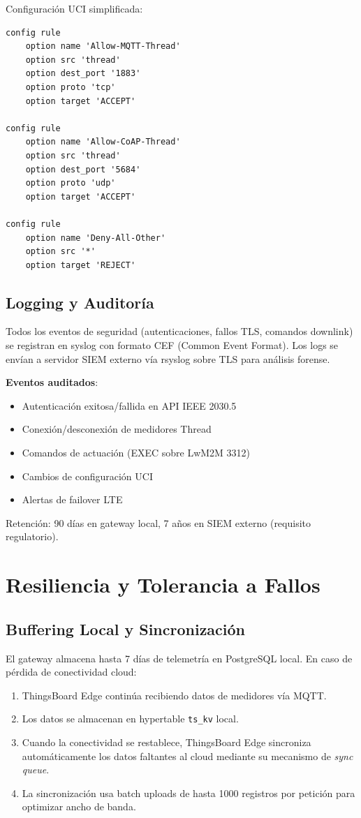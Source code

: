 Configuración UCI simplificada:

\begin{verbatim}
config rule
    option name 'Allow-MQTT-Thread'
    option src 'thread'
    option dest_port '1883'
    option proto 'tcp'
    option target 'ACCEPT'

config rule
    option name 'Allow-CoAP-Thread'
    option src 'thread'
    option dest_port '5684'
    option proto 'udp'
    option target 'ACCEPT'

config rule
    option name 'Deny-All-Other'
    option src '*'
    option target 'REJECT'
\end{verbatim}

\subsection{Logging y Auditoría}

Todos los eventos de seguridad (autenticaciones, fallos TLS, comandos downlink) se registran en syslog con formato CEF (Common Event Format). Los logs se envían a servidor SIEM externo vía rsyslog sobre TLS para análisis forense.

\textbf{Eventos auditados}:
\begin{itemize}
    \item Autenticación exitosa/fallida en API IEEE 2030.5
    \item Conexión/desconexión de medidores Thread
    \item Comandos de actuación (EXEC sobre LwM2M 3312)
    \item Cambios de configuración UCI
    \item Alertas de failover LTE
\end{itemize}

Retención: 90 días en gateway local, 7 años en SIEM externo (requisito regulatorio).

\section{Resiliencia y Tolerancia a Fallos}

\subsection{Buffering Local y Sincronización}

El gateway almacena hasta 7 días de telemetría en PostgreSQL local. En caso de pérdida de conectividad cloud:

\begin{enumerate}
    \item ThingsBoard Edge continúa recibiendo datos de medidores vía MQTT.
    \item Los datos se almacenan en hypertable \texttt{ts\_kv} local.
    \item Cuando la conectividad se restablece, ThingsBoard Edge sincroniza automáticamente los datos faltantes al cloud mediante su mecanismo de \textit{sync queue}.
    \item La sincronización usa batch uploads de hasta 1000 registros por petición para optimizar ancho de banda.
\end{enumerate}

